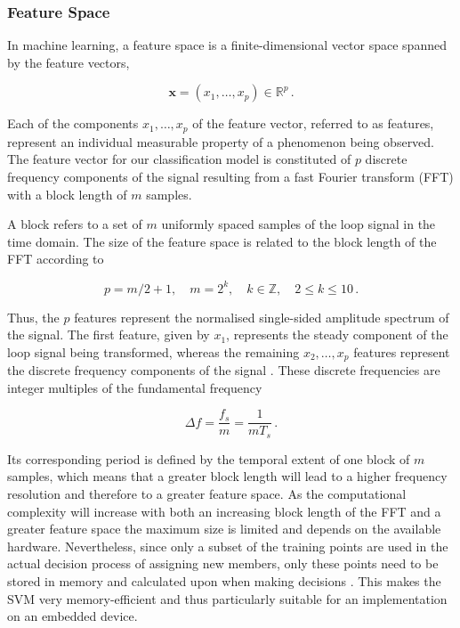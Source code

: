 \subsubsection{Feature Space}
In machine learning, a feature space is a finite-dimensional vector space spanned by the feature vectors,

\begin{equation}
   \bm{x} = (x_1, \dots, x_p) \in \mathbb{R}^p\,.   
\end{equation}
   
\noindent
Each of the components $x_1, \dots, x_p$ of the feature vector, referred to as features, represent an individual measurable property of a phenomenon being observed. The feature vector for our classification model is constituted of $p$ discrete frequency components of the signal resulting from a fast Fourier transform (FFT) with a block length of $m$ samples.

A block refers to a set of $m$ uniformly spaced samples of the loop signal in the time domain. The size of the feature space is related to the block length of the FFT according to 

\begin{equation}
p = m / 2 + 1, \quad m = 2^k, \quad k \in \mathbb{Z}, \quad 2 \leq k \leq 10\,.
\label{eq:space_dim}
\end{equation}

\noindent
Thus, the $p$ features represent the normalised single-sided amplitude spectrum of the signal. The first feature, given by $x_1$, represents the steady component of the loop signal being transformed, whereas the remaining $x_2, \dots, x_p$ features represent the discrete frequency components of the signal \cite{smith1997scientist}. These discrete frequencies are integer multiples of the fundamental frequency

\begin{equation}
\Delta f = \frac{f_s}{m} = \frac{1}{m T_s}\,.
\end{equation}

\noindent
Its corresponding period is defined by the temporal extent of one block of $m$ samples, which means that a greater block length will lead to a higher frequency resolution and therefore to a greater feature space. As the computational complexity will increase with both an increasing block length of the FFT and a greater feature space the maximum size is limited and depends on the available hardware. Nevertheless, since only a subset of the training points are used in the actual decision process of assigning new members, only these points need to be stored in memory and calculated upon when making decisions \cite{svm_beginners}. This makes the SVM very memory-efficient and thus particularly suitable for an implementation on an embedded device.

